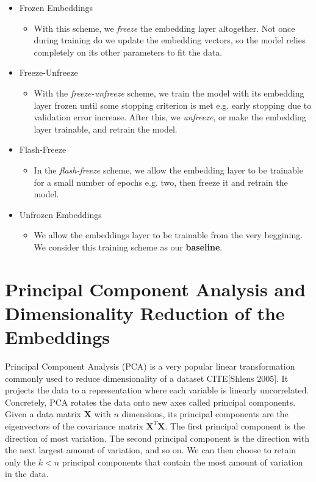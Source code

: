 \begin{itemize}
  \item{Frozen Embeddings}
  \begin{itemize}
    \item{With this scheme, we \textit{freeze} the embedding layer altogether. Not once during training do we update
    the embedding vectors, so the model relies completely on its other parameters to fit the data.}
  \end{itemize}
  \item{Freeze-Unfreeze}
  \begin{itemize}
    \item{With the \textit{freeze-unfreeze} scheme, we train the model with its embedding layer frozen until some
    stopping criterion is met e.g. early stopping due to validation error increase. After this, we \textit{unfreeze}, or make the
    embedding layer trainable, and retrain the model.}
  \end{itemize}
  \item{Flash-Freeze}
  \begin{itemize}
    \item{In the \textit{flash-freeze} scheme, we allow the embedding layer to be trainable for a small number of
    epochs e.g. two, then freeze it and retrain the model.}
  \end{itemize}
  \item{Unfrozen Embeddings}
  \begin{itemize}
    \item{We allow the embeddings layer to be trainable from the very beggining. We consider this training scheme as our \textbf{baseline}.}
  \end{itemize}
\end{itemize}

\section{Principal Component Analysis and Dimensionality Reduction of the Embeddings}
Principal Component Analysis (PCA) is a very popular linear transformation commonly used to reduce dimensionality of a dataset CITE[Shlens 2005].
It projects the data to a representation where each variable is linearly uncorrelated. Concretely, PCA rotates the data onto new axes called principal
components. Given a data matrix $\bm{X}$ with $n$ dimensions, its principal components are the eigenvectors of the covariance matrix $\bm{X}^T\bm{X}$. The first principal component is the direction of most variation. The second principal component is the direction with the next largest amount
of variation, and so on. We can then choose to retain only the $k<n$ principal components that contain the most amount of variation in the data.

